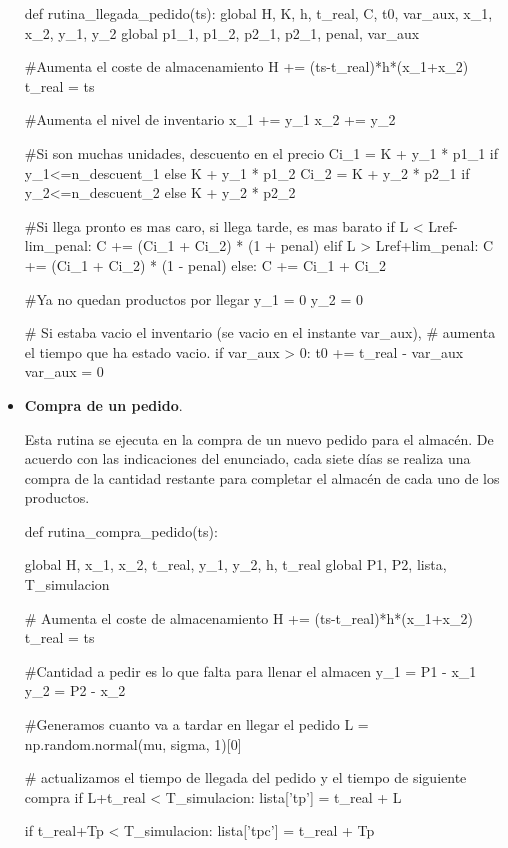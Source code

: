 \documentclass[a4paper,12pt]{article}
\begin{document}
\begin{itemize}
	\begin{python}
def rutina_llegada_pedido(ts):
	global H, K, h, t_real, C, t0, var_aux, x_1, x_2, y_1, y_2
	global p1_1, p1_2, p2_1, p2_1, penal, var_aux
	
	#Aumenta el coste de almacenamiento
	H += (ts-t_real)*h*(x_1+x_2)
	t_real = ts
	
	#Aumenta el nivel de inventario
	x_1 += y_1
	x_2 += y_2
	
	#Si son muchas unidades, descuento en el precio
	Ci_1 = K + y_1 * p1_1 if y_1<=n_descuent_1 else K + y_1 * p1_2
	Ci_2 = K + y_2 * p2_1 if y_2<=n_descuent_2 else K + y_2 * p2_2
	
	#Si llega pronto es mas caro, si llega tarde, es mas barato
	if L < Lref-lim_penal:
		C += (Ci_1 + Ci_2) * (1 + penal)
	elif L > Lref+lim_penal:
		C += (Ci_1 + Ci_2) * (1 - penal)
	else:
		C += Ci_1 + Ci_2
		
	#Ya no quedan productos por llegar
	y_1 = 0
	y_2 = 0
	
	# Si estaba vacio el inventario (se vacio en el instante var_aux),
	# aumenta el tiempo que ha estado vacio.
	if var_aux > 0:
		t0 += t_real - var_aux
		var_aux = 0
	\end{python}
	
	\item \textbf{Compra de un pedido}. 
	
	Esta rutina se ejecuta en la compra de un nuevo pedido para el almacén. De acuerdo con las indicaciones del enunciado, cada siete días se realiza una compra de la cantidad restante para completar el almacén de cada uno de los productos. 
	
	\begin{python}
def rutina_compra_pedido(ts):

	global H, x_1, x_2, t_real, y_1, y_2, h, t_real
	global P1, P2, lista, T_simulacion
	
	# Aumenta el coste de almacenamiento
	H += (ts-t_real)*h*(x_1+x_2)
	t_real = ts
	
	#Cantidad a pedir es lo que falta para llenar el almacen
	y_1 = P1 - x_1
	y_2 = P2 - x_2
	
	#Generamos cuanto va a tardar en llegar el pedido
	L = np.random.normal(mu, sigma, 1)[0]
	
	# actualizamos el tiempo de llegada del pedido y el tiempo de siguiente compra
	if L+t_real < T_simulacion:
		lista['tp'] = t_real + L
	
	if t_real+Tp < T_simulacion:
		lista['tpc'] = t_real + Tp
	\end{python}
	
	\end{itemize}
	
\end{document}
